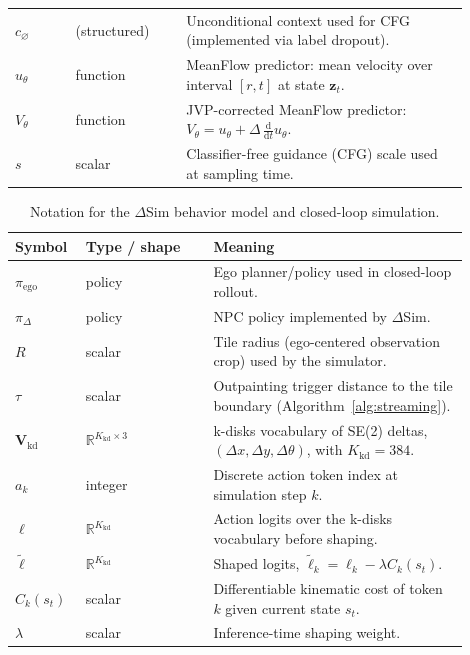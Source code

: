 \documentclass{article}
\theoremstyle{plain}
\theoremstyle{definition}
\theoremstyle{remark}
\begin{document}
\begin{table}[t]
\begin{tabular}{p{0.12\linewidth}p{0.22\linewidth}p{0.56\linewidth}}
\(c_{\varnothing}\) & (structured) & Unconditional context used for CFG (implemented via label dropout). \\
\(u_{\theta}\) & function & MeanFlow predictor: mean velocity over interval \([r,t]\) at state \(\mathbf{z}_t\). \\
\(V_{\theta}\) & function & JVP-corrected MeanFlow predictor: \(V_{\theta}=u_{\theta}+\Delta\,\frac{\mathrm{d}}{\mathrm{d}t}u_{\theta}\). \\
\(s\) & scalar & Classifier-free guidance (CFG) scale used at sampling time. \\
\bottomrule
\end{tabular}
\end{table}

\begin{table}[t]
\centering
\small
\caption{Notation for the \(\Delta\)Sim behavior model and closed-loop simulation.}
\label{tab:app-notation-behavior}
\begin{tabular}{p{0.12\linewidth}p{0.26\linewidth}p{0.52\linewidth}}
\toprule
Symbol & Type / shape & Meaning \\
\midrule
\(\pi_{\mathrm{ego}}\) & policy & Ego planner/policy used in closed-loop rollout. \\
\(\pi_{\Delta}\) & policy & NPC policy implemented by \(\Delta\)Sim. \\
\(R\) & scalar & Tile radius (ego-centered observation crop) used by the simulator. \\
\(\tau\) & scalar & Outpainting trigger distance to the tile boundary (Algorithm~\ref{alg:streaming}). \\
\(\mathbf{V}_{\mathrm{kd}}\) & \(\mathbb{R}^{K_{\mathrm{kd}}\times 3}\) & k-disks vocabulary of SE(2) deltas, \((\Delta x,\Delta y,\Delta\theta)\), with \(K_{\mathrm{kd}}{=}384\). \\
\(a_k\) & integer & Discrete action token index at simulation step \(k\). \\
\(\ell\) & \(\mathbb{R}^{K_{\mathrm{kd}}}\) & Action logits over the k-disks vocabulary before shaping. \\
\(\tilde{\ell}\) & \(\mathbb{R}^{K_{\mathrm{kd}}}\) & Shaped logits, \(\tilde{\ell}_k=\ell_k-\lambda C_k(s_t)\). \\
\(C_k(s_t)\) & scalar & Differentiable kinematic cost of token \(k\) given current state \(s_t\). \\
\(\lambda\) & scalar & Inference-time shaping weight. \\

\end{tabular}
\end{table}
\end{document}
